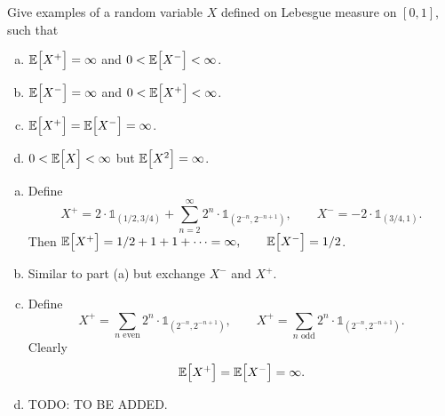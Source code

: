 \begin{problem}
	Give examples of a random variable $ X $ defined on Lebesgue measure on $ [0,1] $, such that 
	\begin{enumerate}[(a)]
		\item $ \mathbb{E}\big[X^+\big] = \infty $ and $ 0 < \mathbb{E}\big[X^-\big] < \infty $.
		\item $ \mathbb{E}\big[X^-\big] = \infty $ and $ 0 < \mathbb{E}\big[X^+\big] < \infty $.
		\item $ \mathbb{E}\big[X^+\big] = \mathbb{E}\big[X^-\big] = \infty $.
		\item $ 0 < \mathbb{E}\big[X\big] < \infty $ but $ \mathbb{E}\big[X^2\big] = \infty $.
	\end{enumerate}
\end{problem}
\begin{solution}
	\begin{enumerate}[(a)]
		\item Define 
		\[ X^+ = 2\cdot \mathds{1}_{(1/2,3/4)} + \sum_{n=2}^\infty 2^n \cdot \mathds{1}_{(2^{-n}, 2^{-n+1})}, 
		\qquad 
		X^- = -2 \cdot \mathds{1}_{(3/4,1)}. \]
		Then $ \mathbb{E}\big[X^+\big] = 1/2 + 1 + 1 + \cdots = \infty, \qquad \mathbb{E}\big[X^-\big] = 1/2 $.
		
		\item Similar to part (a) but exchange $ X^- $ and $ X^+ $.
		
		\item Define
		\[ X^+ = \sum_{n\text{ even}} 2^n \cdot \mathds{1}_{(2^{-n}, 2^{-n+1})}, 
		\qquad 
		X^+ = \sum_{n\text{ odd}} 2^n \cdot \mathds{1}_{(2^{-n}, 2^{-n+1})}. \]
		Clearly
		\[ \mathbb{E}\big[X^+\big] = \mathbb{E}\big[X^-\big] = \infty. \]
		
		\item {\color{red} \noindent TODO: TO BE ADDED.}
	\end{enumerate}
\end{solution}


\newpage
